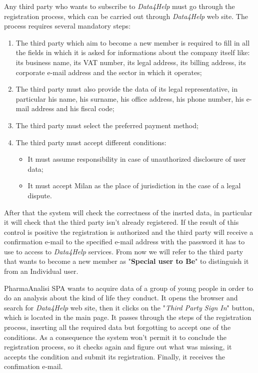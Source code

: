Any third party who wants to subscribe to \textit{Data4Help} must go through the registration process, which can be carried out through \textit{Data4Help} web site. The process requires several mandatory steps:
\begin{enumerate}
  \item The third party which aim to become a new member is required to fill in all the fields in which it is asked for informations about the company itself like: its business name, its VAT number, its legal address, its billing address, its corporate e-mail address and the sector in which it operates;
  \item The third party must also provide the data of its legal representative, in particular his name, his surname, his office address, his phone number, his e-mail address and his fiscal code;
  \item The third party must select the preferred payment method;
  \item The third party must accept different conditions:
    \begin{itemize}
      \item It must assume responsibility in case of unauthorized disclosure of user data;
      \item It must accept Milan as the place of jurisdiction in the case of a legal dispute.
    \end{itemize}
\end{enumerate}
After that the system will check the correctness of the insrted data, in particular it will check that the third party isn't already registered. If the result of this control is positive the registration is authorized and the third party will receive a confirmation e-mail to the specified e-mail address with the password it has to use to access to \textit{Data4Help} services.
From now we will refer to the third party that wants to become a new member as "\textbf{Special user to Be}" to distinguish it from an Individual user.

PharmaAnalisi SPA wants to acquire data of a group of young people in order to do an analysis about the kind of life they conduct. It opens the browser and search for \textit{Data4Help} web site, then it clicks on the "\textit{Third Party Sign In}" button, which is located in the main page. It passes through the steps of the registration process, inserting all the required data but forgotting to accept one of the conditions. As a consequence the system won't permit it to conclude the registration process, so it checks again and figure out what was missing, it accepts the condition and submit its registration. Finally, it receives the confimation e-mail.

